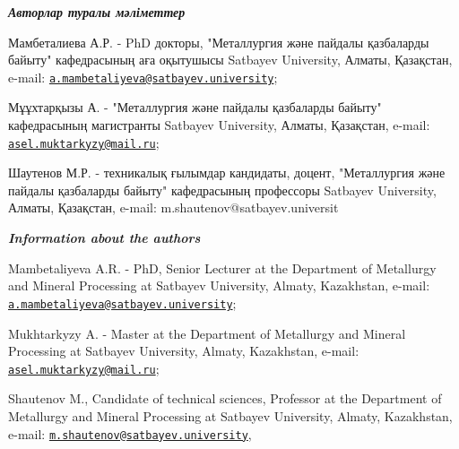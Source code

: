 \begin{authorinfo}
\emph{{\bfseries Авторлар туралы мәліметтер}}

Мамбеталиева А.Р. - PhD докторы, "Металлургия және пайдалы қазбаларды
байыту" кафедрасының аға оқытушысы Satbayev University, Алматы,
Қазақстан, e-mail:
\href{mailto:a.mambetaliyeva@satbayev.university}{\nolinkurl{a.mambetaliyeva@satbayev.university}};

Мұұхтарқызы А. - "Металлургия және пайдалы қазбаларды байыту"
кафедрасының магистранты Satbayev University, Алматы, Қазақстан, e-mail:
\href{mailto:asel.muktarkyzy@mail.ru}{\nolinkurl{asel.muktarkyzy@mail.ru}};

Шаутенов М.Р. - техникалық ғылымдар кандидаты, доцент, "Металлургия және
пайдалы қазбаларды байыту" кафедрасының профессоры Satbayev University,
Алматы, Қазақстан, e-mail: m.shautenov@satbayev.universit

\emph{{\bfseries Information about the authors}}

Mambetaliyeva A.R. - PhD, Senior Lecturer at the Department of
Metallurgy and Mineral Processing at Satbayev University, Almaty,
Kazakhstan, e-mail:
\href{mailto:a.mambetaliyeva@satbayev.university}{\nolinkurl{a.mambetaliyeva@satbayev.university}};

Mukhtarkyzy A. - Master at the Department of Metallurgy and Mineral
Processing at Satbayev University, Almaty, Kazakhstan, e-mail:
\href{mailto:asel.muktarkyzy@mail.ru}{\nolinkurl{asel.muktarkyzy@mail.ru}};

Shautenov M., Candidate of technical sciences, Professor at the
Department of Metallurgy and Mineral Processing at Satbayev University,
Almaty, Kazakhstan, e-mail:
\href{mailto:m.shautenov@satbayev.university}{\nolinkurl{m.shautenov@satbayev.university}},
\end{authorinfo}
